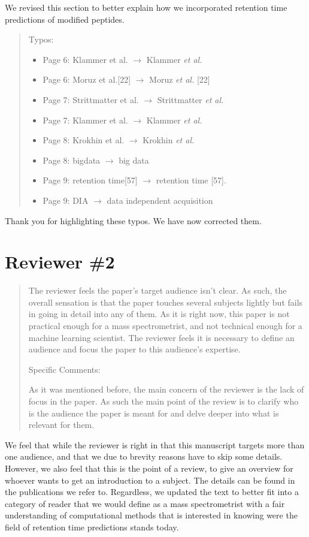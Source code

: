 \documentclass[letterpaper]{article}
\newcommand{\breview}{\begin{quotation}\begin{bf}\noindent}
\newcommand{\ereview}{\end{bf}\end{quotation}}
\begin{document}
We revised this section to better explain how we incorporated
retention time predictions of modified peptides. 

\breview
Typos:
\begin{itemize}
\item Page 6: Klammer et al. $\to$ Klammer {\em et al.}
\item Page 6: Moruz et al.[22] $\to$ Moruz {\em et al.} [22]
\item Page 7: Strittmatter et al. $\to$ Strittmatter {\em et al.}
\item Page 7: Klammer et al. $\to$ Klammer {\em et al.}
\item Page 8: Krokhin et al. $\to$ Krokhin {\em et al.}
\item Page 8: bigdata $\to$ big data
\item Page 9: retention time[57] $\to$ retention time [57].
\item Page 9: DIA $\to$ data independent acquisition
\end{itemize}

\ereview

Thank you for highlighting these typos. We have now corrected them.


\section*{Reviewer \#2}

\breview


The reviewer feels the paper’s target audience isn’t clear. As such,
the overall sensation is that the paper touches several subjects
lightly but fails in going in detail into any of them. As it is right
now, this paper is not practical enough for a mass spectrometrist, and
not technical enough for a machine learning scientist. The reviewer
feels it is necessary to define an audience and focus the paper to
this audience’s expertise.

Specific Comments:

As it was mentioned before, the main concern of the reviewer is the
lack of focus in the paper. As such the main point of the review is to
clarify who is the audience the paper is meant for and delve deeper
into what is relevant for them.

\ereview

We feel that while the reviewer is right in that this manuscript
targets more than one audience, and that we due to brevity reasons
have to skip some details. However, we also feel that this is the
point of a review, to give an overview for whoever wants to get an
introduction to a subject. The details can be found in the
publications we refer to. Regardless, we updated the text to better
fit into a category of reader that we would define as a mass
spectrometrist with a fair understanding of computational methods that
is interested in knowing were the field of retention time predictions
stands today.  
\end{document}
